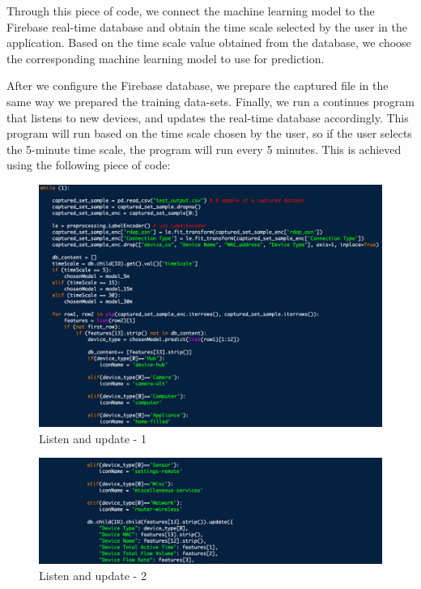 \documentclass{article}
\begin{document}
Through this piece of code, we connect the machine learning model to the Firebase real-time database and obtain the time scale selected by the user in the application. Based on the time scale value obtained from the database, we choose the corresponding machine learning model to use for prediction.\pagebreak

After we configure the Firebase database, we prepare the captured file in the same way we prepared the training data-sets. Finally, we run a continues program that listens to new devices, and updates the real-time database accordingly. This program will run based on the time scale chosen by the user, so if the user selects the 5-minute time scale, the program will run every 5 minutes. This is achieved using the following piece of code:

\begin{figure}[!ht]
    \centering
    \includegraphics[width=13cm]{ML2graphs/listenandupdate1.png}
    \caption{Listen and update - 1} 
\end{figure}

\begin{figure}[!ht]
    \centering
    \includegraphics[width=13cm]{ML2graphs/listenandupdate2.png}
    \caption{Listen and update - 2} 
\end{figure}
\end{document}
